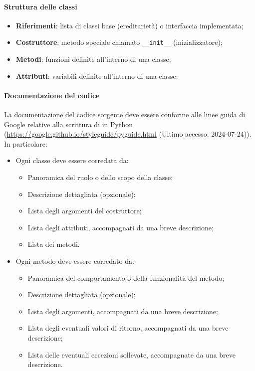 \paragraph*{Struttura delle classi}
\begin{itemize}
  \item \textbf{Riferimenti}: lista di classi base (ereditarietà) o interfaccia implementata;
  \item \textbf{Costruttore}: metodo speciale chiamato \verb|__init__| (inizializzatore);
  \item \textbf{Metodi}: funzioni definite all'interno di una classe;
  \item \textbf{Attributi}: variabili definite all'interno di una classe.
\end{itemize}

\paragraph*{Documentazione del codice}
\par La documentazione del codice sorgente deve essere conforme alle linee guida di Google relative alla scrittura di  in Python (\href{https://google.github.io/styleguide/pyguide.html}{https://google.github.io/styleguide/pyguide.html} (Ultimo accesso: 2024-07-24)). In particolare:
\begin{itemize}
  \item Ogni classe deve essere corredata da:
  \begin{itemize}
    \item Panoramica del ruolo o dello scopo della classe;
    \item Descrizione dettagliata (opzionale);
    \item Lista degli argomenti del costruttore;
    \item Lista degli attributi, accompagnati da una breve descrizione; 
    \item Lista dei metodi.
  \end{itemize}
  \item Ogni metodo deve essere corredato da:
  \begin{itemize}
    \item Panoramica del comportamento o della funzionalità del metodo;
    \item Descrizione dettagliata (opzionale);
    \item Lista degli argomenti, accompagnati da una breve descrizione; 
    \item Lista degli eventuali valori di ritorno, accompagnati da una breve descrizione;
    \item Lista delle eventuali eccezioni sollevate, accompagnate da una breve descrizione.
  \end{itemize}
\end{itemize}

